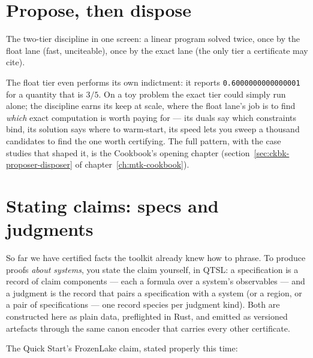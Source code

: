 \section{Propose, then dispose}
\label{sec:tut-two-tier}

The two-tier discipline in one screen: a linear program solved twice,
once by the float lane (fast, unciteable), once by the exact lane
(the only tier a certificate may cite).





The float tier even performs its own indictment: it reports
\texttt{0.6000000000000001} for a quantity that is $3/5$. On a toy
problem the exact tier could simply run alone; the discipline earns
its keep at scale, where the float lane's job is to find \emph{which}
exact computation is worth paying for --- its duals say which
constraints bind, its solution says where to warm-start, its speed
lets you sweep a thousand candidates to find the one worth
certifying. The full pattern, with the case studies that shaped it,
is the Cookbook's opening chapter
(section~\ref{sec:ckbk-proposer-disposer} of
chapter~\ref{ch:mtk-cookbook}).

\section{Stating claims: specs and judgments}
\label{sec:tut-spec}

So far we have certified facts the toolkit already knew how to
phrase. To produce proofs \emph{about systems}, you state the claim
yourself, in QTSL: a specification is a record of claim components
--- each a formula over a system's observables --- and a judgment is
the record that pairs a specification
with a system (or a region, or a pair of specifications --- one
record species per judgment kind). Both are constructed here as
plain data, preflighted in Rust, and emitted as versioned artefacts
through the same canon encoder that carries every other certificate.

The Quick Start's FrozenLake claim, stated properly this time:





